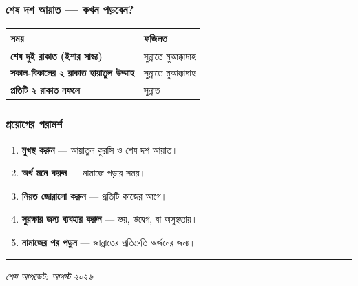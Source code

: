 \subsubsection*{শেষ দশ আয়াত — কখন পড়বেন?}

\begin{table}[h]\centering\small
\begin{tabular}{ll}
সময় & ফজিলত \\
\hline
\textbf{শেষ দুই রাকাত (ইশার সান্ধ্য)} & সুন্নাতে মুআক্কাদাহ \\
\textbf{সকাল-বিকালের ২ রাকাত হায়াতুল উম্মাহ} & সুন্নাতে মুআক্কাদাহ \\
\textbf{প্রতিটি ২ রাকাত নফলে} & সুন্নাত \\
\hline
\end{tabular}
\end{table}

\subsubsection*{প্রয়োগের পরামর্শ}

\begin{enumerate}
\item \textbf{মুখস্থ করুন} — আয়াতুল কুরসি ও শেষ দশ আয়াত।
\item \textbf{অর্থ মনে করুন} — নামাজে পড়ার সময়।
\item \textbf{নিয়ত জোরালো করুন} — প্রতিটি কাজের আগে।
\item \textbf{সুরক্ষার জন্য ব্যবহার করুন} — ভয়, উদ্বেগ, বা অসুস্থতায়।
\item \textbf{নামাজের পর পড়ুন} — জান্নাতের প্রতিশ্রুতি অর্জনের জন্য।
\end{enumerate}
\medskip\hrule\medskip

\textit{শেষ আপডেট: আগস্ট ২০২৬}


